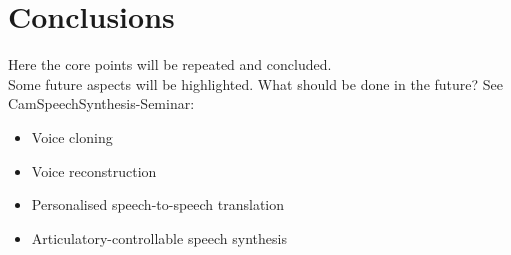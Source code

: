 

\section{Conclusions}
\label{sec:conclusion}

Here the core points will be repeated and concluded.\\
Some future aspects will be highlighted. What should be done in the future?
\vspace{2em}
See CamSpeechSynthesis-Seminar:
\begin{itemize}[leftmargin=10pt]
	\item Voice cloning
	\item Voice reconstruction
	\item Personalised speech-to-speech translation
	\item Articulatory-controllable speech synthesis
\end{itemize}
